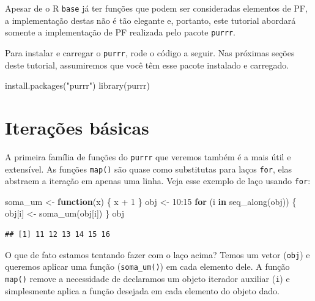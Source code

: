 \documentclass[
]{book}
\newenvironment{Shaded}{\begin{snugshade}}{\end{snugshade}}
\newcommand{\ControlFlowTok}[1]{\textcolor[rgb]{0.13,0.29,0.53}{\textbf{#1}}}
\newcommand{\DecValTok}[1]{\textcolor[rgb]{0.00,0.00,0.81}{#1}}
\newcommand{\FunctionTok}[1]{\textcolor[rgb]{0.00,0.00,0.00}{#1}}
\newcommand{\NormalTok}[1]{#1}
\newcommand{\OtherTok}[1]{\textcolor[rgb]{0.56,0.35,0.01}{#1}}
\newcommand{\SpecialCharTok}[1]{\textcolor[rgb]{0.00,0.00,0.00}{#1}}
\newcommand{\StringTok}[1]{\textcolor[rgb]{0.31,0.60,0.02}{#1}}
\begin{document}
Apesar de o R \texttt{base} já ter funções que podem ser consideradas elementos de PF, a
implementação destas não é tão elegante e, portanto, este tutorial abordará
somente a implementação de PF realizada pelo pacote \texttt{purrr}.

Para instalar e carregar o \texttt{purrr}, rode o código a seguir. Nas próximas seções
deste tutorial, assumiremos que você têm esse pacote instalado e carregado.

\begin{Shaded}
\begin{Highlighting}[]
\FunctionTok{install.packages}\NormalTok{(}\StringTok{"purrr"}\NormalTok{)}
\FunctionTok{library}\NormalTok{(purrr)}
\end{Highlighting}
\end{Shaded}

\hypertarget{iterauxe7uxf5es-buxe1sicas}{%
\section{Iterações básicas}\label{iterauxe7uxf5es-buxe1sicas}}

A primeira família de funções do \texttt{purrr} que veremos também é a mais útil e
extensível. As funções \texttt{map()} são quase como substitutas para laços \texttt{for},
elas abstraem a iteração em apenas uma linha. Veja esse exemplo de laço usando
\texttt{for}:

\begin{Shaded}
\begin{Highlighting}[]
\NormalTok{soma\_um }\OtherTok{\textless{}{-}} \ControlFlowTok{function}\NormalTok{(x) \{ x }\SpecialCharTok{+} \DecValTok{1}\NormalTok{ \}}
\NormalTok{obj }\OtherTok{\textless{}{-}} \DecValTok{10}\SpecialCharTok{:}\DecValTok{15}
\ControlFlowTok{for}\NormalTok{ (i }\ControlFlowTok{in} \FunctionTok{seq\_along}\NormalTok{(obj)) \{}
\NormalTok{  obj[i] }\OtherTok{\textless{}{-}} \FunctionTok{soma\_um}\NormalTok{(obj[i])}
\NormalTok{\}}
\NormalTok{obj}
\end{Highlighting}
\end{Shaded}

\begin{verbatim}
## [1] 11 12 13 14 15 16
\end{verbatim}

O que de fato estamos tentando fazer com o laço acima? Temos um vetor (\texttt{obj}) e
queremos aplicar uma função (\texttt{soma\_um()}) em cada elemento dele. A função \texttt{map()}
remove a necessidade de declaramos um objeto iterador auxiliar (\texttt{i}) e
simplesmente aplica a função desejada em cada elemento do objeto dado.
\end{document}
